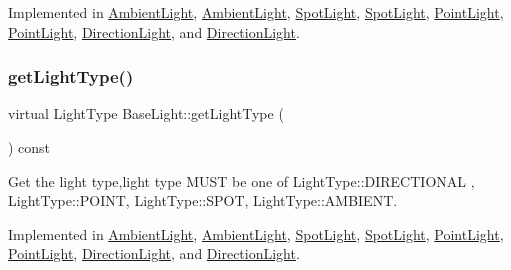 Implemented in \hyperlink{classAmbientLight_acde40671ef0fa809c5827cf0fefe52a5}{Ambient\+Light}, \hyperlink{classAmbientLight_acde40671ef0fa809c5827cf0fefe52a5}{Ambient\+Light}, \hyperlink{classSpotLight_aaf789b4d66aaff407f00d1fc4532fbfb}{Spot\+Light}, \hyperlink{classSpotLight_aaf789b4d66aaff407f00d1fc4532fbfb}{Spot\+Light}, \hyperlink{classPointLight_aa5747f236903390e8b2834e330b8af61}{Point\+Light}, \hyperlink{classPointLight_aa5747f236903390e8b2834e330b8af61}{Point\+Light}, \hyperlink{classDirectionLight_a43c8fb8a7450d086430e0e2790a6a619}{Direction\+Light}, and \hyperlink{classDirectionLight_a43c8fb8a7450d086430e0e2790a6a619}{Direction\+Light}.

\mbox{\label{classBaseLight_a620db25fed828de7328b83587f388030}} 
\subsubsection{\texorpdfstring{get\+Light\+Type()}{getLightType()}\hspace{0.1cm}{\footnotesize\ttfamily [2/2]}}
{\footnotesize\ttfamily virtual Light\+Type Base\+Light\+::get\+Light\+Type (\begin{DoxyParamCaption}{ }\end{DoxyParamCaption}) const\hspace{0.3cm}{\ttfamily [pure virtual]}}

Get the light type,light type M\+U\+ST be one of Light\+Type\+::\+D\+I\+R\+E\+C\+T\+I\+O\+N\+AL , Light\+Type\+::\+P\+O\+I\+NT, Light\+Type\+::\+S\+P\+OT, Light\+Type\+::\+A\+M\+B\+I\+E\+NT. 

Implemented in \hyperlink{classAmbientLight_acde40671ef0fa809c5827cf0fefe52a5}{Ambient\+Light}, \hyperlink{classAmbientLight_acde40671ef0fa809c5827cf0fefe52a5}{Ambient\+Light}, \hyperlink{classSpotLight_aaf789b4d66aaff407f00d1fc4532fbfb}{Spot\+Light}, \hyperlink{classSpotLight_aaf789b4d66aaff407f00d1fc4532fbfb}{Spot\+Light}, \hyperlink{classPointLight_aa5747f236903390e8b2834e330b8af61}{Point\+Light}, \hyperlink{classPointLight_aa5747f236903390e8b2834e330b8af61}{Point\+Light}, \hyperlink{classDirectionLight_a43c8fb8a7450d086430e0e2790a6a619}{Direction\+Light}, and \hyperlink{classDirectionLight_a43c8fb8a7450d086430e0e2790a6a619}{Direction\+Light}.

\mbox{\label{classBaseLight_a76470def8a65956abdb17b3d71c1a7a0}} 
